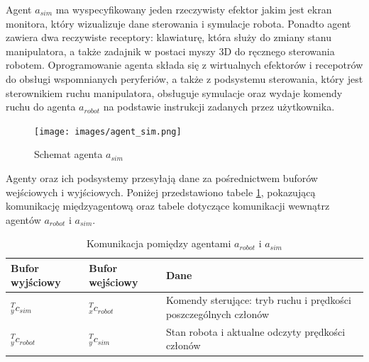 \documentclass[a4paper, 12pt, twoside]{article}
\begin{document}
Agent $a_{sim}$ ma wyspecyfikowany jeden rzeczywisty efektor jakim jest ekran monitora, który wizualizuje dane sterowania i symulacje robota. Ponadto agent zawiera dwa reczywiste receptory: klawiaturę, która służy do zmiany stanu manipulatora, a także zadajnik w postaci myszy 3D do ręcznego sterowania robotem. Oprogramowanie agenta składa się z wirtualnych efektorów i recepotrów do obsługi wspomnianych peryferiów, a także z podsystemu sterowania, który jest sterownikiem ruchu manipulatora, obsługuje symulacje oraz wydaje komendy ruchu do agenta $a_{robot}$ na podstawie instrukcji zadanych przez użytkownika.

\begin{figure}[hbt!]
\centering
\texttt{[image: images/agent\_sim.png]}
\caption{Schemat agenta $a_{sim}$ }
\label{fig:agent_sim}
\end{figure}

Agenty oraz ich podsystemy przesyłają dane za pośrednictwem buforów wejściowych i wyjściowych. Poniżej przedstawiono tabele \ref{table:comrobotsim}, pokazującą komunikację międzyagentową oraz tabele  dotyczące komunikacji wewnątrz agentów $a_{robot}$ i $a_{sim}$. 

\begin{table}[H]
\begin{center}
\caption{Komunikacja pomiędzy agentami $a_{robot}$ i $a_{sim}$} \label{table:comrobotsim}
\begin{tabular}{ | l | l | p{6cm} |}
\hline
 Bufor wyjściowy & Bufor wejściowy & Dane \\ 
\hline
 $^T_yc_{sim}$ & $^T_xc_{robot}$ & Komendy sterujące: tryb ruchu i prędkości poszczególnych członów \\ 
\hline
 $^T_yc_{robot}$ & $^T_yc_{sim}$ & Stan robota i aktualne odczyty prędkości członów \\
\hline
\end{tabular}
\end{center}
\end{table}
\end{document}
